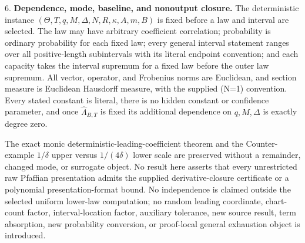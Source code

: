 \begin{proposition}
6. \textbf{Dependence, mode, baseline, and nonoutput closure.} The deterministic instance
   \((\Theta,T,q,M,\Delta,N,R,\kappa,A,m,B)\) is fixed before a law and interval are selected. The law may have
   arbitrary coefficient correlation; probability is ordinary probability for each fixed law; every general
   interval statement ranges over all positive-length subintervals with its literal endpoint convention; and
   each capacity takes the interval supremum for a fixed law before the outer law supremum. All vector,
   operator, and Frobenius norms are Euclidean, and section measure is Euclidean Hausdorff measure, with the
   supplied (N=1) convention. Every stated constant is literal, there is no hidden constant or confidence
   parameter, and once \(\widehat\Lambda_{B,T}\) is fixed its additional dependence on \(q,M,\Delta\) is exactly
   degree zero.

   The exact monic deterministic-leading-coefficient theorem and the Counter-example
   \(1/\delta\) upper versus \(1/(4\delta)\) lower scale are preserved without a remainder, changed mode,
   or surrogate object. No result here asserts that every unrestricted raw Pfaffian presentation admits the
   supplied derivative-closure certificate or a polynomial presentation-format bound. No independence is
   claimed outside the selected uniform lower-law computation; no random leading coordinate, chart-count
   factor, interval-location factor, auxiliary tolerance, new source result, term absorption, new probability
   conversion, or proof-local general exhaustion object is introduced.


\end{proposition}

